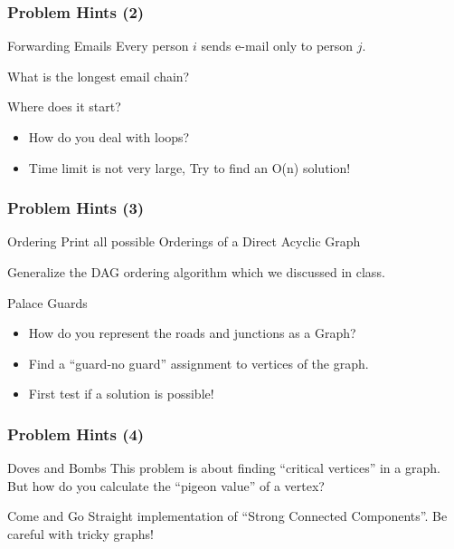 \begin{frame}
  \frametitle{Problem Hints (2)}
  {\smaller
    \begin{block}{Forwarding Emails}
      Every person $i$ sends e-mail only to person $j$.
      
      \bigskip
      
      What is the longest email chain?
      
      \bigskip
      
      Where does it start?
    \end{block}
    
    \begin{itemize}
    \item How do you deal with loops?
    \item Time limit is not very large, Try to find an O(n) solution!
    \end{itemize} 
  }
\end{frame}

\begin{frame}
  \frametitle{Problem Hints (3)}
  {\smaller
    \begin{block}{Ordering}
      Print all possible Orderings of a Direct Acyclic Graph

      \bigskip

      Generalize the DAG ordering algorithm which we discussed in class.
    \end{block}
    
    \begin{block}{Palace Guards}
      \begin{itemize}
        \item How do you represent the roads and junctions as a Graph?
        \item Find a ``guard-no guard'' assignment to vertices of the
          graph.
        \item First test if a solution is possible!
      \end{itemize}
    \end{block}    
  }
\end{frame}

\begin{frame}
  \frametitle{Problem Hints (4)}
  {\smaller
    \begin{block}{Doves and Bombs}
      This problem is about finding ``critical vertices'' in a
      graph. But how do you calculate the ``pigeon value'' of a
      vertex?
    \end{block}

    \begin{block}{Come and Go}
      Straight implementation of ``Strong Connected Components''. Be
      careful with tricky graphs!
    \end{block}    
  }
\end{frame}

